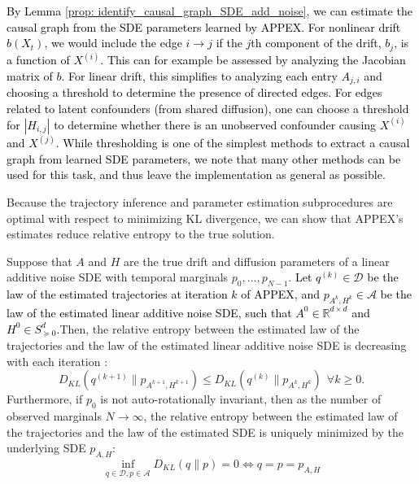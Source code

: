 \documentclass[twoside,11pt]{article}
\newcommand{\R} {\mathbb R}
\newcommand{\rv}[1]{\textcolor{black}{#1}}
\begin{document}
\begin{remark}
\rv{By Lemma \cref{prop: identify_causal_graph_SDE_add_noise}, we can estimate the causal graph from the SDE parameters learned by APPEX. For nonlinear drift $b(X_t)$, we would include the edge $i \to j$ if the $j$th component of the drift, $b_j$, is a function of $X^{(i)}$. This can for example be assessed by analyzing the Jacobian matrix of $b$. For linear drift, this simplifies to analyzing each entry $A_{j,i}$ and choosing a threshold to determine the presence of directed edges. For edges related to latent confounders (from shared diffusion), one can choose a threshold for $|H_{i,j}|$ to determine whether there is an unobserved confounder causing $X^{(i)}$ and $X^{(j)}$. While thresholding is one of the simplest methods to extract a causal graph from learned SDE parameters, we note that many other methods can be used for this task, and thus leave the implementation as general as possible.}
\end{remark}
Because the trajectory inference and parameter estimation subprocedures are optimal with respect to minimizing KL divergence, we can show that APPEX's estimates reduce relative entropy to the true solution.
\begin{lemma}
\label{lemma: APPEX_decrease_KL}
Suppose that $A$ and $H$ are the true drift and diffusion parameters of a linear additive noise SDE with temporal marginals $p_0, ..., p_{N-1}$. \rv{Let $q^{(k)} \in \mathcal{D}$ be the law of the estimated trajectories at iteration $k$ of APPEX, and $p_{A^{k}, H^{k}} \in \mathcal{A}$ be the law of the estimated linear additive noise SDE, such that $A^{0} \in \R^{d \times d}$ and $H^{0} \in S^d_{\succeq 0}$.}Then, the relative entropy between the estimated law of the trajectories and the law of the estimated linear additive noise SDE is decreasing with each iteration \citep{shen2024learning}:
$$D_{KL}(q^{(k+1)} \| p_{A^{k+1}, H^{k+1} }  ) \le  D_{KL}(q^{(k)} \| p_{A^{k}, H^{k} })  \ \ \forall k \ge 0. $$ 
Furthermore, if $p_0$ is not auto-rotationally invariant, then as the number of observed marginals $N \to \infty$, the relative entropy between the estimated law of the trajectories and the law of the estimated SDE is uniquely minimized by the underlying SDE $p_{A,H}$:
$$\inf\limits_{q \in \mathcal{D}, p \in \mathcal{A}}D_{KL}(q\|p) = 0 \iff q=p = p_{A, H}$$
\end{lemma}
\end{document}
